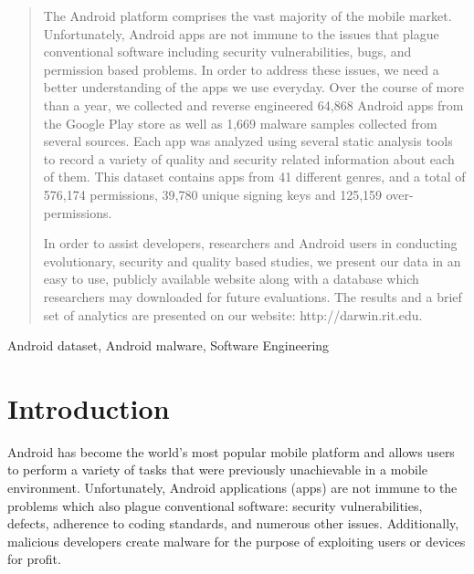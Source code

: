 \documentclass{sig-alternate-05-2015}
\begin{document}
\maketitle
\begin{abstract}

The Android platform comprises the vast majority of the mobile market. Unfortunately, Android apps are not immune to the issues that plague conventional software including security vulnerabilities, bugs, and permission based problems. In order to address these issues, we need a better understanding of the apps we use everyday. Over the course of more than a year, we collected and reverse engineered 64,868 Android apps from the Google Play store as well as 1,669 malware samples collected from several sources. Each app was analyzed using several static analysis tools to record a variety of quality and security related information about each of them. This dataset contains apps from 41 different genres, and a total of 576,174 permissions, 39,780 unique signing keys and 125,159 over-permissions.

In order to assist developers, researchers and Android users in conducting evolutionary, security and quality based studies, we present our data in an easy to use, publicly available website along with a database which researchers may downloaded for future evaluations. The results and a brief set of analytics are presented on our website: http://darwin.rit.edu.


\end{abstract}

\begin{keywords}

Android dataset, Android malware, Software Engineering

\end{keywords}


\section{Introduction}




Android has become the world's most popular mobile platform and allows users to perform a variety of tasks that were previously unachievable in a mobile environment. Unfortunately, Android applications (apps) are not immune to the problems which also plague conventional software: security vulnerabilities, defects, adherence to coding standards, and numerous other issues. Additionally, malicious developers create malware for the purpose of exploiting users or devices for profit.
\end{document}
